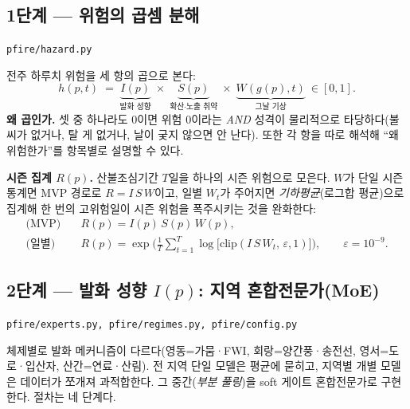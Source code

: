 \documentclass[11pt,a4paper]{article}
\newcommand{\src}[1]{{\footnotesize\color{gray}\texttt{#1}}}
\newcommand{\clip}{\mathrm{clip}}
\begin{document}
\subsection{1단계 — 위험의 곱셈 분해}\label{sec:decomp}
\src{pfire/hazard.py}

전주 하루치 위험을 세 항의 곱으로 본다:
\begin{equation}
h(p,t)\;=\;\underbrace{I(p)}_{\text{발화 성향}}\;\times\;
\underbrace{S(p)}_{\text{확산·노출 취약}}\;\times\;
\underbrace{W(g(p),t)}_{\text{그날 기상}}\ \in[0,1].
\label{eq:hazard}
\end{equation}
\textbf{왜 곱인가.} 셋 중 하나라도 0이면 위험 0이라는 \emph{AND} 성격이 물리적으로 타당하다(불씨가
없거나, 탈 게 없거나, 날이 궂지 않으면 안 난다). 또한 각 항을 따로 해석해 ``왜 위험한가''를
항목별로 설명할 수 있다.

\textbf{시즌 집계 $R(p)$.} 산불조심기간 $T$일을 하나의 시즌 위험으로 모은다. $W$가 단일 시즌통계면
MVP 경로로 $R=I\,S\,W$이고, 일별 $W_t$가 주어지면 \emph{기하평균}(로그합 평균)으로 집계해 한 번의
고위험일이 시즌 위험을 폭주시키는 것을 완화한다:
\begin{align}
\text{(MVP)}\quad & R(p)=I(p)\,S(p)\,W(p),\\
\text{(일별)}\quad & R(p)=\exp\!\Big(\tfrac{1}{T}\textstyle\sum_{t=1}^{T}
\log\big[\clip(I\,S\,W_t,\,\varepsilon,1)\big]\Big),\qquad \varepsilon=10^{-9}.
\label{eq:season}
\end{align}

\subsection{2단계 — 발화 성향 $I(p)$: 지역 혼합전문가(MoE)}\label{sec:moe}
\src{pfire/experts.py, pfire/regimes.py, pfire/config.py}

체제별로 발화 메커니즘이 다르다(영동=가뭄·FWI, 회랑=양간풍·송전선, 영서=도로·입산자,
산간=연료·산림). 전 지역 단일 모델은 평균에 묻히고, 지역별 개별 모델은 데이터가 쪼개져
과적합한다. 그 중간(\emph{부분 풀링})을 soft 게이트 혼합전문가로 구현한다. 절차는 네 단계다.
\end{document}
